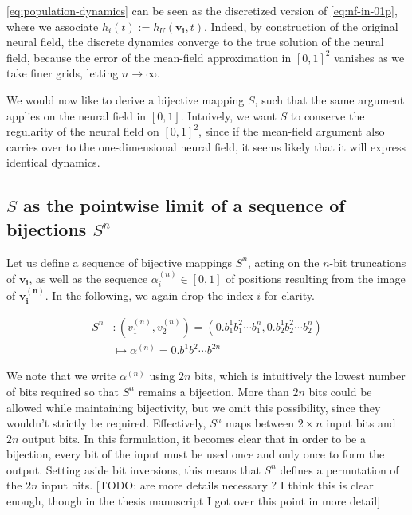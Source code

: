 \documentclass[NETN,manuscript]{stjour-new}
\renewcommand{\vec}[1]{\boldsymbol{#1}}
\begin{document}
\autoref{eq:population-dynamics} can be seen as the discretized version of \autoref{eq:nf-in-01p}, where we associate $h_i(t) := h_U(\vec{v_i}, t)$. Indeed, by construction of the original neural field, the discrete dynamics converge to the true solution of the neural field, because the error of the mean-field approximation in $[0,1]^2$ vanishes as we take finer grids, letting $n \to \infty$.

We would now like to derive a bijective mapping $S$, such that the same argument applies on the neural field in $[0,1]$. Intuively, we want $S$ to conserve the regularity of the neural field on $[0,1]^2$, since if the mean-field argument also carries over to the one-dimensional neural field, it seems likely that it will express identical dynamics.

\subsection{$S$ as the pointwise limit of a sequence of bijections $S^n$}

Let us define a sequence of bijective mappings $S^n$, acting on the $n$-bit truncations of $\vec{v_i}$, as well as the sequence $\alpha_i^{(n)} \in [0,1]$ of positions resulting from the image of $\vec{v_i^{(n)}}$. In the following, we again drop the index $i$ for clarity.

\begin{equation} \begin{aligned}
S^n &: (v_1^{(n)}, v_2^{(n)}) = (0.b_1^1 b_1^2 \cdots b_1^n, 0.b_2^1 b_2^2 \cdots b_2^n) \\
&\mapsto \alpha^{(n)} = 0.b^1 b^2 \cdots b^{2n}
\end{aligned} \end{equation}

We note that we write $\alpha^{(n)}$ using $2n$ bits, which is intuitively the lowest number of bits required so that $S^n$ remains a bijection. More than $2n$ bits could be allowed while maintaining bijectivity, but we omit this possibility, since they wouldn't strictly be required. Effectively, $S^n$ maps between $2\times n$ input bits and $2n$ output bits. In this formulation, it becomes clear that in order to be a bijection, every bit of the input must be used once and only once to form the output. Setting aside bit inversions, this means that $S^n$ defines a permutation of the $2n$ input bits. [TODO: are more details necessary ? I think this is clear enough, though in the thesis manuscript I got over this point in more detail]
\end{document}
